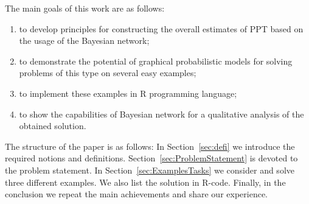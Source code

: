 \documentclass[12pt]{article}
\begin{document}
The main goals of this work are as follows:
\begin{enumerate}
\item to develop principles for constructing the overall estimates of PPT based on the usage of the Bayesian network;
\item to demonstrate the potential of graphical probabilistic models for solving problems of this type on several easy examples;
\item to implement these examples in R programming language;
\item to show the capabilities of Bayesian network for a qualitative analysis of the obtained solution.
\end{enumerate}
The structure of the paper is as follows: In Section~\ref{sec:defi} we introduce the required notions and definitions. Section~\ref{sec:ProblemStatement} is devoted to the problem statement. In Section~\ref{sec:ExamplesTasks} we consider and solve three different examples. We also list the solution in R-code. Finally, in the conclusion we repeat the main achievements and share our experience.%
%
\end{document}
